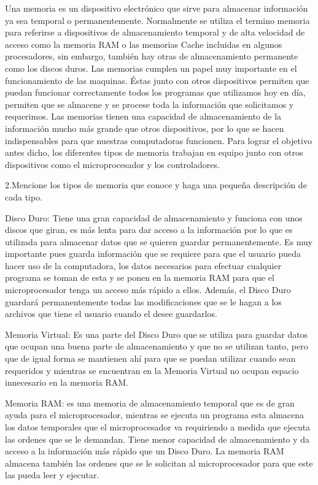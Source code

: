 \documentclass{article}
\begin{document}
Una memoria es un dispositivo electrónico que sirve para almacenar información ya sea temporal o permanentemente. Normalmente se utiliza el termino memoria para referirse a dispositivos de almacenamiento temporal y de alta velocidad de acceso como la memoria RAM o las memorias Cache incluidas en algunos procesadores, sin embargo, también hay otras de almacenamiento permanente como los discos duros.
Las memorias cumplen un papel muy importante en el funcionamiento de las maquinas. Éstas junto con otros dispositivos permiten que puedan funcionar correctamente todos los programas que utilizamos hoy en día, permiten que se almacene y se procese toda la información que solicitamos y requerimos. Las memorias tienen una capacidad de almacenamiento de la información mucho más grande que otros dispositivos, por lo que se hacen indispensables para que nuestras computadoras funcionen. Para lograr el objetivo antes dicho, los diferentes tipos de memoria trabajan en equipo junto con otros dispositivos como el microprocesador y los controladores.

2.Mencione los tipos de memoria que conoce y haga una pequeña descripción de cada tipo.

Disco Duro: Tiene una gran capacidad de almacenamiento y funciona con unos discos que giran, es más lenta para dar acceso a la información por lo que es utilizada para almacenar datos que se quieren guardar permanentemente. Es muy importante pues guarda información que se requiere para que el usuario pueda hacer uso de la computadora, los datos necesarios para efectuar cualquier programa se toman de esta y se ponen en la memoria RAM para que el microprocesador tenga un acceso más rápido a ellos. Además, el Disco Duro guardará permanentemente todas las modificaciones que se le hagan a los archivos que tiene el usuario cuando el desee guardarlos.

Memoria Virtual: Es una parte del Disco Duro que se utiliza para guardar datos que ocupan una buena parte de almacenamiento y que no se utilizan tanto, pero que de igual forma se mantienen ahí para que se puedan utilizar cuando sean requeridos y mientras se encuentran en la Memoria Virtual no ocupan espacio innecesario en la memoria RAM.\cite{YouBioit}

Memoria RAM: es una memoria de almacenamiento temporal que es de gran ayuda para el microprocesador, mientras se ejecuta un programa esta almacena los datos temporales que el microprocesador va requiriendo a medida que ejecuta las ordenes que se le demandan. Tiene menor capacidad de almacenamiento y da acceso a la información más rápido que un Disco Duro. La memoria RAM almacena también las ordenes que se le solicitan al microprocesador para que este las pueda leer y ejecutar.
 
\end{document}
